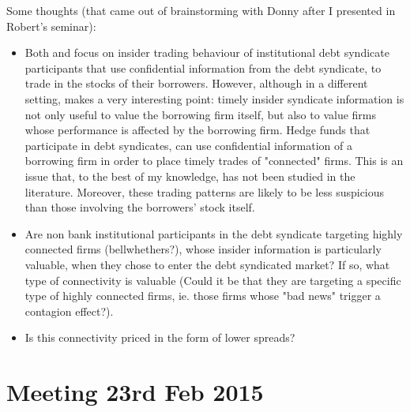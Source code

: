 \documentclass[english, 3p]{elsarticle}
\begin{document}
Some thoughts (that came out of brainstorming with Donny after I presented \cite{Tseng2014W} in Robert's seminar):
\begin{itemize}
\item Both \cite{Ivashina2011} and \cite{Bushman2010} focus on insider trading behaviour of institutional debt syndicate participants that use confidential information from the debt syndicate, to trade in the stocks of their borrowers. However, although in a different setting, \cite{Tseng2014W} makes a very interesting point: timely insider syndicate information is not only useful to value the borrowing firm itself, but also to value firms whose performance is affected by the borrowing firm. Hedge funds that participate in debt syndicates, can use confidential information of a borrowing firm in order to place timely trades of "connected" firms. This is an issue that, to the best of my knowledge, has not been studied in the literature. Moreover, these trading patterns are likely to be less suspicious than those involving the borrowers' stock itself. 

\item Are non bank institutional participants in the debt syndicate targeting highly connected firms (bellwhethers?), whose insider information is particularly valuable, when they chose to enter the debt syndicated market? If so, what type of connectivity is valuable (Could it be that they are targeting a specific type of highly connected firms, ie. those firms whose "bad news" trigger a contagion effect?). 
\item Is this connectivity priced in the form of lower spreads? 

\end{itemize}


\section{Meeting 23rd Feb 2015} 
\end{document}
